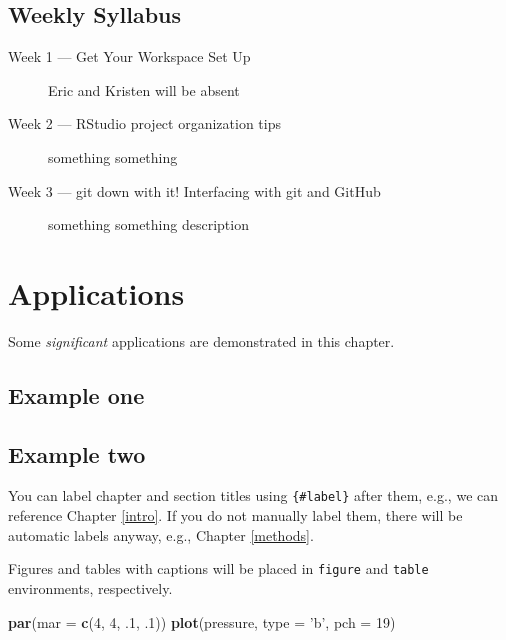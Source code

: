 \documentclass[]{book}
\newenvironment{Shaded}{\begin{snugshade}}{\end{snugshade}}
\newcommand{\KeywordTok}[1]{\textcolor[rgb]{0.13,0.29,0.53}{\textbf{{#1}}}}
\newcommand{\DataTypeTok}[1]{\textcolor[rgb]{0.13,0.29,0.53}{{#1}}}
\newcommand{\DecValTok}[1]{\textcolor[rgb]{0.00,0.00,0.81}{{#1}}}
\newcommand{\StringTok}[1]{\textcolor[rgb]{0.31,0.60,0.02}{{#1}}}
\newcommand{\NormalTok}[1]{{#1}}
\theoremstyle{definition}
\theoremstyle{definition}
\theoremstyle{remark}
\begin{document}
\section{Weekly Syllabus}\label{weekly-syllabus}

\begin{description}
\item[Week 1 --- Get Your Workspace Set Up]
Eric and Kristen will be absent
\item[Week 2 --- RStudio project organization tips]
something something
\item[Week 3 --- git down with it! Interfacing with git and GitHub]
something something description
\end{description}

\chapter{Applications}\label{applications}

Some \emph{significant} applications are demonstrated in this chapter.

\section{Example one}\label{example-one}

\section{Example two}\label{example-two}

You can label chapter and section titles using \texttt{\{\#label\}}
after them, e.g., we can reference Chapter \ref{intro}. If you do not
manually label them, there will be automatic labels anyway, e.g.,
Chapter \ref{methods}.

Figures and tables with captions will be placed in \texttt{figure} and
\texttt{table} environments, respectively.

\begin{Shaded}
\begin{Highlighting}[]
\KeywordTok{par}\NormalTok{(}\DataTypeTok{mar =} \KeywordTok{c}\NormalTok{(}\DecValTok{4}\NormalTok{, }\DecValTok{4}\NormalTok{, .}\DecValTok{1}\NormalTok{, .}\DecValTok{1}\NormalTok{))}
\KeywordTok{plot}\NormalTok{(pressure, }\DataTypeTok{type =} \StringTok{'b'}\NormalTok{, }\DataTypeTok{pch =} \DecValTok{19}\NormalTok{)}
\end{Highlighting}
\end{Shaded}
\end{document}
